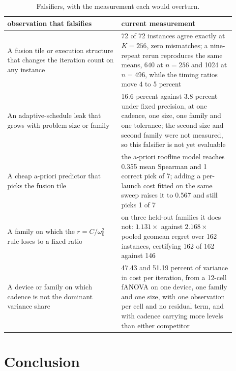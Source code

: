 \begin{table}[t]
\centering
\caption{Falsifiers, with the measurement each would overturn.}
\label{tab:falsify}
\begin{tabular}{p{0.46\linewidth}p{0.46\linewidth}}
\toprule
observation that falsifies & current measurement \\
\midrule
A fusion tile or execution structure that changes the iteration count on any
instance
& 72 of 72 instances agree exactly at $K=256$, zero mismatches; a nine-repeat
rerun reproduces the same means, 640 at $n{=}256$ and 1024 at $n{=}496$, while
the timing ratios move 4 to 5 percent \\
\addlinespace
An adaptive-schedule leak that grows with problem size or family
& 16.6 percent against 3.8 percent under fixed precision, at one cadence, one
size, one family and one tolerance; the second size and second family were not
measured, so this falsifier is not yet evaluable \\
\addlinespace
A cheap a-priori predictor that picks the fusion tile
& the a-priori roofline model reaches 0.355 mean Spearman and 1 correct pick of
7; adding a per-launch cost fitted on the same sweep raises it to 0.567 and
still picks 1 of 7 \\
\addlinespace
A family on which the $r = C/\omega_0^{2}$ rule loses to a fixed ratio
& on three held-out families it does not: $1.131\times$ against $2.168\times$
pooled geomean regret over 162 instances, certifying 162 of 162 against 146 \\
\addlinespace
A device or family on which cadence is not the dominant variance share
& 47.43 and 51.19 percent of variance in cost per iteration, from a 12-cell
fANOVA on one device, one family and one size, with one observation per cell and
no residual term, and with cadence carrying more levels than either competitor \\
\bottomrule
\end{tabular}
\end{table}

\section{Conclusion}

